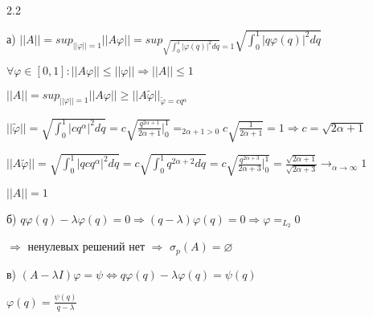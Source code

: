 \documentclass[russian]{article}
\begin{document}
2.2

а) $||A||=sup_{||\varphi||=1}||A\varphi||=sup_{\sqrt{\int_{0}^{1}|\varphi(q)|^{2}dq}=1}\sqrt{\int_{0}^{1}|q\varphi(q)|^{2}dq}$

$\forall\varphi\in[0,1]:||A\varphi||\le||\varphi||\Rightarrow||A||\le1$

$||A||=sup_{||\varphi||=1}||A\varphi||\ge||A\widetilde{\varphi}||_{\widetilde{\varphi}=cq^{\alpha}}$

$||\widetilde{\varphi}||=\sqrt{\int_{0}^{1}|cq^{\alpha}|^{2}dq}=c\sqrt{\frac{q^{2\alpha+1}}{2\alpha+1}|_{0}^{1}}=_{2\alpha+1>0}c\sqrt{\frac{1}{2\alpha+1}}=1\Rightarrow c=\sqrt{2\alpha+1}$

$||A\widetilde{\varphi}||=\sqrt{\int_{0}^{1}|qcq^{\alpha}|^{2}dq}=c\sqrt{\int_{0}^{1}q^{2\alpha+2}dq}=c\sqrt{\frac{q^{2\alpha+3}}{2\alpha+3}|_{0}^{1}}=\frac{\sqrt{2\alpha+1}}{\sqrt{2\alpha+3}}\rightarrow_{\alpha\rightarrow\infty}1$

$||A||=1$

б) $q\varphi(q)-\lambda\varphi(q)=0\Rightarrow(q-\lambda)\varphi(q)=0\Rightarrow\varphi=_{L_{2}}0$

$\Rightarrow$ ненулевых решений нет $\Rightarrow$ $\sigma_{p}(A)=\varnothing$

в) $(A-\lambda I)\varphi=\psi\Leftrightarrow q\varphi(q)-\lambda\varphi(q)=\psi(q)$

$\varphi(q)=\frac{\psi(q)}{q-\lambda}$
\end{document}
